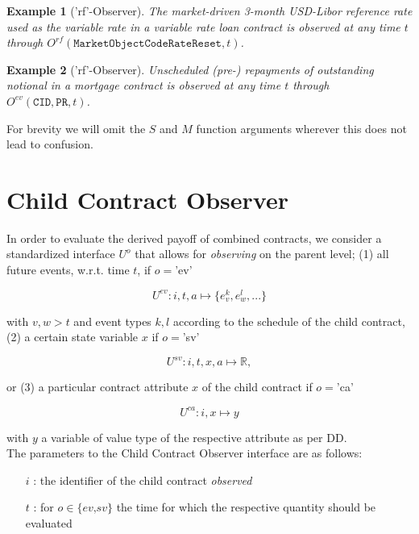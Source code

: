 \documentclass[9pt,oneside]{amsart}
\newtheorem{example}{Example}
\newcommand{\Real}{\mathbb{R}}
\newcommand{\attr}[1]{\texttt{#1}}
\newcommand{\obs}[3]{O^{#1}(#2,#3)}
\newcommand{\cldfunc}[1]{U^{#1}}
\begin{document}
\begin{multicols}{2}
\begin{example}['rf'-Observer] The market-driven 3-month USD-Libor reference rate used as the variable rate in a variable rate loan contract is observed at any time $t$ through $\obs{rf}{\attr{MarketObjectCodeRateReset}}{t}$.
\end{example}

\begin{example}['rf'-Observer] Unscheduled (pre-) repayments of outstanding notional in a mortgage contract is observed at any time $t$ through $\obs{ev}{\attr{CID},\attr{PR}}{t}$.
\end{example}

For brevity we will omit the $S$ and $M$ function arguments wherever this does not lead to confusion.



\section{Child Contract Observer}\label{sec:cldobserver}

In order to evaluate the derived payoff of combined contracts, we consider a standardized interface $\cldfunc{o}$ that allows for \textit{observing} on the parent level; (1) all future events, w.r.t. time $t$, if $o=$'ev'

\[
	\cldfunc{ev}: i,t,a \mapsto \{e_v^{k},e_w^{l},...\}
\]

with $v,w>t$ and event types $k,l$ according to the schedule of the child contract, (2) a certain state variable $x$ if $o=$'sv'

\[
	\cldfunc{sv}: i,t,x,a \mapsto \Real,
\]

or (3) a particular contract attribute $x$ of the child contract if $o=$'ca'

\[
	\cldfunc{ca}: i,x \mapsto y
\]

with $y$ a variable of value type of the respective attribute as per DD.\\

The parameters to the Child Contract Observer interface are as follows:

\begin{itemize}
	\item[$i$]: the identifier of the child contract \textit{observed}

	\item[$t$]: for $o\in\{\textit{ev,sv}\}$ the time for which the respective quantity should be evaluated


\end{itemize}
\end{multicols}
\end{document}
